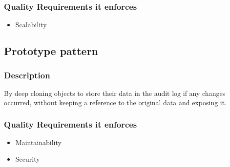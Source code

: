 		\subsubsection{Quality Requirements it enforces}
		\begin{itemize}
			\item Scalability
		\end{itemize}	
		
	\subsection{Prototype pattern}
		\subsubsection{Description}
 			By deep cloning objects to store their data in the audit log if any changes occurred, without keeping a reference to the original data and exposing it.
		\subsubsection{Quality Requirements it enforces}
		\begin{itemize}
			\item Maintainability
			\item Security
		\end{itemize}	